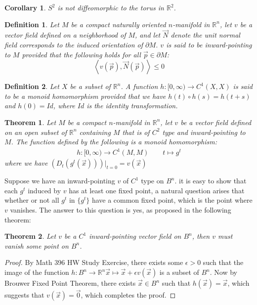 \documentclass[11pt,oneside]{book}
\theoremstyle{break}
\theoremstyle{break}
\newtheorem{thm}{Theorem}[section]
\newtheorem{corT}[lem]{Corollary}
\newtheorem{defn}{Definition}[corL]
\newcommand{\R}{\mathbb{R}}
\begin{document}
\begin{corT}
$S^2$ is not diffeomorphic to the torus in $\R^2$. 
\end{corT}


\begin{defn}
Let $M$ be a compact naturally oriented $n$-manifold in $\R^n$, let $v$ be a vector field defined on a neighborhood of $M$, and let $\vec{N}$ denote  the unit normal field corresponds to the induced orientation of $\partial M$. $v$ is said to be inward-pointing to $M$ provided that the following holds for all $\vec{p}\in \partial M$: $$\left<v(\vec{p}), \vec{N}(\vec{p})\right> \leq 0$$
\end{defn}

\begin{defn}
Let $X$ be a subset of $\R^n$. A function $h:[0,\infty)\to C^1(X,X)$ is said to be a monoid homomorphism provided that we have $h(t) \circ h(s) = h(t+s)$ and $h(0) = Id$, where $Id$ is the identity transformation.
\end{defn}

\begin{thm}
Let $M$ be a compact $n$-manifold in $\R^n$, let $v$ be a vector field defined on an open subset of $\R^n$ containing $M$ that is of $C^2$ type and inward-pointing to $M$. The function defined by the following is a monoid homomorphism:
\begin{align*}
h: [0,\infty) \to C^1(M,M) \qquad t\mapsto g^t
\end{align*}
where we have $\left(D_t(g^t(\vec{x}))\right)|_{t=0} = v(\vec{x})$
\end{thm}

Suppose we have an inward-pointing $v$ of $C^1$ type on $B^n$. it is easy to show that each $g^t$ induced by $v$ has at least one fixed point, a natural question arises that whether or not all $g^t$ in $\{g^t\}$ have a common fixed point, which is the point where $v$ vanishes. The answer to this question is yes, as proposed in the following theorem:

\begin{thm}
Let $v$ be a $C^1$ inward-pointing vector field on $B^n$, then $v$ must vanish some point on $B^n$.
\end{thm}
\begin{proof}
By Math 396 HW Study Exercise, there exists some $\epsilon>0$ such that the image of the function $h:B^n \to \R^n \vec{x}\mapsto \vec{x}+\epsilon v(\vec{x})$ is a subset of $B^n$. Now by Brouwer Fixed Point Theorem, there exists $\vec{x} \in B^n$ such that $h(\vec{x})  =\vec{x}$, which suggests that $v(\vec{x}) = \vec{0}$, which completes the proof.
\end{proof}
\end{document}
